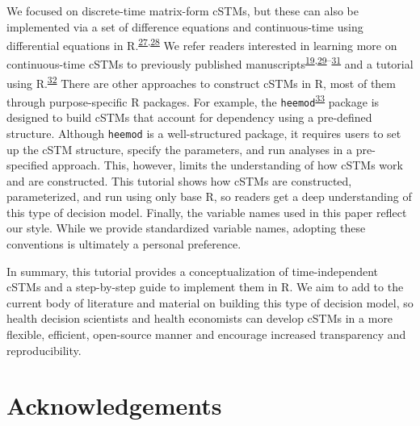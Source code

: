 \documentclass[
]{article}
\begin{document}
We focused on discrete-time matrix-form cSTMs, but these can also be implemented via a set of difference equations and continuous-time using differential equations in R.\textsuperscript{\protect\hyperlink{ref-Grimmett2014}{27},\protect\hyperlink{ref-Axler2005}{28}} We refer readers interested in learning more on continuous-time cSTMs to previously published manuscripts\textsuperscript{\protect\hyperlink{ref-VanRosmalen2013}{19},\protect\hyperlink{ref-Cao2016}{29}--\protect\hyperlink{ref-Soares2012}{31}} and a tutorial using R.\textsuperscript{\protect\hyperlink{ref-Frederix2013a}{32}} There are other approaches to construct cSTMs in R, most of them through purpose-specific R packages. For example, the \texttt{heemod}\textsuperscript{\protect\hyperlink{ref-Filipovic-Pierucci2017}{33}} package is designed to build cSTMs that account for dependency using a pre-defined structure. Although \texttt{heemod} is a well-structured package, it requires users to set up the cSTM structure, specify the parameters, and run analyses in a pre-specified approach. This, however, limits the understanding of how cSTMs work and are constructed. This tutorial shows how cSTMs are constructed, parameterized, and run using only base R, so readers get a deep understanding of this type of decision model. Finally, the variable names used in this paper reflect our style. While we provide standardized variable names, adopting these conventions is ultimately a personal preference.

In summary, this tutorial provides a conceptualization of time-independent cSTMs and a step-by-step guide to implement them in R. We aim to add to the current body of literature and material on building this type of decision model, so health decision scientists and health economists can develop cSTMs in a more flexible, efficient, open-source manner and encourage increased transparency and reproducibility.

\hypertarget{acknowledgements}{%
\section{Acknowledgements}\label{acknowledgements}}
\end{document}
